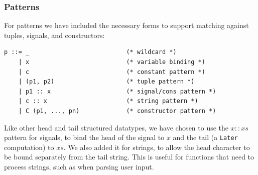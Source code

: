\subsubsection{Patterns}

For patterns we have included the necessary forms to support matching against tuples, signals, and constructors:

\begin{verbatim}
p ::= _                           (* wildcard *)
    | x                           (* variable binding *)
    | c                           (* constant pattern *)
    | (p1, p2)                    (* tuple pattern *)
    | p1 :: x                     (* signal/cons pattern *)
    | c :: x                      (* string pattern *)
    | C (p1, ..., pn)             (* constructor pattern *)
\end{verbatim}

Like other head and tail structured datatypes, we have chosen to use the $x :: xs$ pattern for signals, to bind the head of the signal to $x$ and the tail (a \texttt{Later} computation) to $xs$.
We also added it for strings, to allow the head character to be bound separately from the tail string. This is useful for functions that need to process strings, such as when parsing user input.









